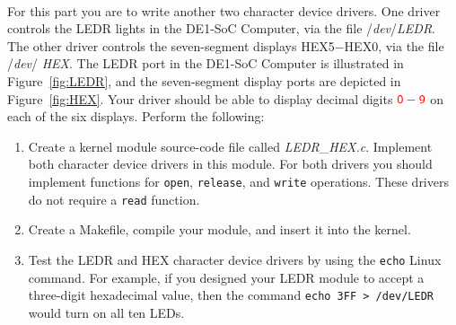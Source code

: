 \documentclass[epsfig,10pt,fullpage]{article}
\begin{document}
~\\
\noindent
For this part you are to write another two character device drivers. One driver controls
the LEDR lights in the DE1-SoC Computer, via the file /{\it dev}/{\it LEDR}. The
other driver controls the seven-segment displays HEX5$-$HEX0, via the file /{\it dev}/{\it
HEX}. The LEDR port in the DE1-SoC Computer is illustrated in Figure~\ref{fig:LEDR}, and the
seven-segment display ports are depicted in Figure~\ref{fig:HEX}. Your driver should be 
able to display decimal digits ${\color{red}\sf{0}}-{\color{red}\sf{9}}$ on each of the six displays.
Perform the following:

\begin{enumerate}
\item Create a kernel module source-code file called {\it LEDR}\_{\it HEX.c}. Implement both
character device drivers in this module. For both drivers you should implement functions for
\texttt{open}, \texttt{release}, and \texttt{write} operations. These drivers do not require 
a \texttt{read} function.
\item Create a Makefile, compile your module, and insert it into the kernel.
\item Test the LEDR and HEX character device drivers by using the \texttt{echo} Linux command.
For example, if you designed your LEDR module to accept a three-digit hexadecimal value,
then the command \texttt{echo 3FF > /dev/LEDR} would turn on all ten LEDs.
\end{enumerate}
\end{document}
